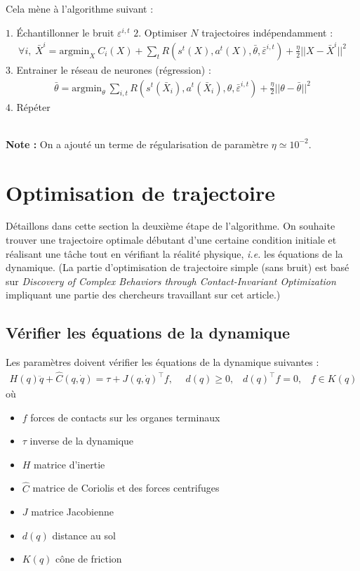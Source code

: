 \documentclass[a4paper,10pt]{article}
\begin{document}
Cela mène à l'algorithme suivant : 
\begin{algorithm}
\caption{}
\begin{algorithmic}
\STATE $1.$ Échantillonner le bruit $\varepsilon^{i,t}$
\STATE $2.$ Optimiser $N$ trajectoires indépendamment : 
\begin{align*}
\forall i, \hspace{3pt} \bar{X}^{i} = \text{argmin}_{X} ~C_{i}(X) + \sum_{t} R(s^t(X),a^t(X),\bar{\theta},\bar{\varepsilon}^{i,t}) + \frac{\eta}{2}||X-\bar{X}^{i}||^2
\end{align*}
\STATE $3.$ Entrainer le réseau de neurones (régression) : 
\begin{align*}
\bar{\theta} = \text{argmin}_{\theta} ~\sum_{i,t} R(s^t(\bar{X}_i),a^t(\bar{X}_i),\theta,\bar{\varepsilon}^{i,t}) + \frac{\eta}{2}||\theta-\bar{\theta}||^2
\end{align*}
\STATE $4.$ Répéter
\end{algorithmic}
\end{algorithm}
\\
\textbf{Note : } On a ajouté un terme de régularisation de paramètre $\eta \simeq 10^{-2}$.

\section{Optimisation de trajectoire}
Détaillons dans cette section la deuxième étape de l'algorithme. On souhaite trouver une trajectoire optimale débutant d'une certaine condition initiale et réalisant une tâche tout en vérifiant la réalité physique, \textit{i.e.} les équations de la dynamique. 
(La partie d'optimisation de trajectoire simple (sans bruit) est basé sur \textit{Discovery of Complex Behaviors through Contact-Invariant Optimization} \cite{mordatch2012discovery} impliquant une partie des chercheurs travaillant sur cet article.)
\subsection{Vérifier les équations de la dynamique}
Les paramètres doivent vérifier les équations de la dynamique suivantes : 
\begin{align*}
H(q)\ddot{q} + \hat{C}(q,\dot{q}) = \tau + J(q,\dot{q})^{\top}f, \hspace{15pt}
 d(q) \geq 0,  \hspace{10pt}
 d(q)^{\top}f = 0,  \hspace{10pt}
 f \in K(q) 
  \end{align*}
où
  \begin{itemize}
  \item $f$ forces de contacts sur les organes terminaux
  \item $\tau$ inverse de la dynamique
  \item $H$ matrice d'inertie
  \item $\hat{C}$ matrice de Coriolis et des forces centrifuges
  \item $J$ matrice Jacobienne
  \item $d(q)$ distance au sol
  \item $K(q)$ cône de friction
  \end{itemize}
\end{document}
